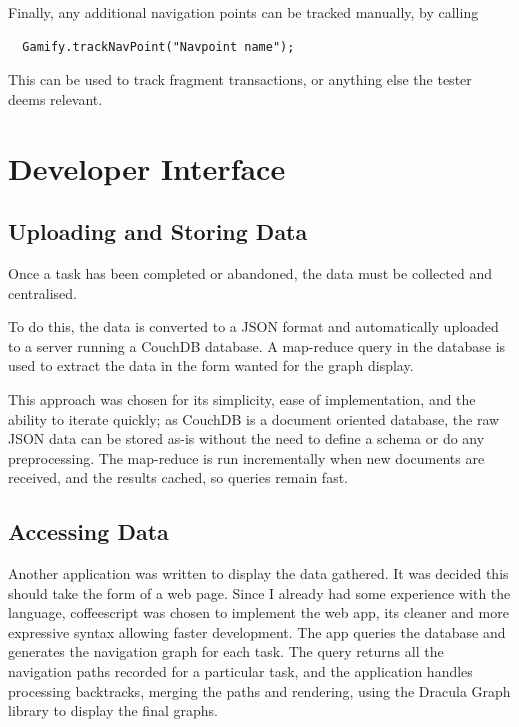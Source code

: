 Finally, any additional navigation points can be tracked manually,
by calling

\begin{verbatim}
  Gamify.trackNavPoint("Navpoint name");
\end{verbatim}

This can be used to track fragment transactions, or anything else
the tester deems relevant.

\section{Developer Interface}

\subsection{Uploading and Storing Data}

Once a task has been completed or abandoned, the data must be
collected and centralised.

To do this, the data is converted to a JSON format and automatically
uploaded to a server running a CouchDB database. A map-reduce query
in the database is used to extract the data in the form wanted
for the graph display.

This approach was chosen for its simplicity, ease of implementation,
and the ability to iterate quickly; as CouchDB is a document oriented
database, the raw JSON data can be stored as-is without the need
to define a schema or do any preprocessing. The map-reduce is run
incrementally when new documents are received, and the results
cached, so queries remain fast.

\subsection{Accessing Data}

Another application was written to display the data gathered. It was
decided this should take the form of a web page. Since I already
had some experience with the language, coffeescript was chosen to
implement the web app, its cleaner and more expressive syntax
allowing faster development. The app queries the database and
generates the navigation graph for each task. The query returns all
the navigation paths recorded for a particular task, and the
application handles processing backtracks, merging the paths and
rendering, using the Dracula Graph library \cite{dracula-graph} to
display the final graphs.
